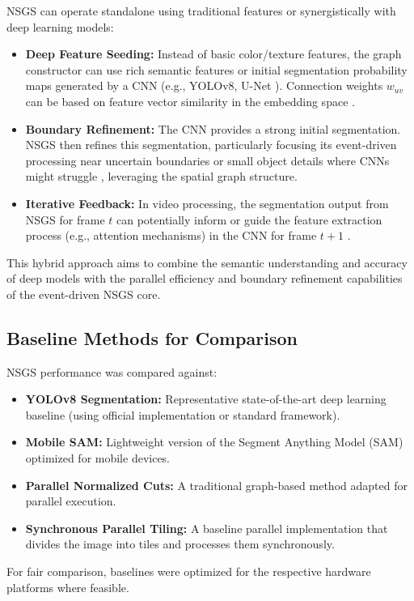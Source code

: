 \documentclass[conference]{IEEEtran}
\begin{document}
NSGS can operate standalone using traditional features or synergistically with deep learning models:
\begin{itemize}
    \item \textbf{Deep Feature Seeding:} Instead of basic color/texture features, the graph constructor can use rich semantic features or initial segmentation probability maps generated by a CNN (e.g., YOLOv8, U-Net \cite{Ronneberger2015}). Connection weights \(w_{uv}\) can be based on feature vector similarity in the embedding space \cite{Hinton2006}.
    \item \textbf{Boundary Refinement:} The CNN provides a strong initial segmentation. NSGS then refines this segmentation, particularly focusing its event-driven processing near uncertain boundaries or small object details where CNNs might struggle \cite{Wang2020, Lin2022}, leveraging the spatial graph structure.
    \item \textbf{Iterative Feedback:} In video processing, the segmentation output from NSGS for frame \(t\) can potentially inform or guide the feature extraction process (e.g., attention mechanisms) in the CNN for frame \(t+1\) \cite{Chen2021, Sun2019}.
\end{itemize}
This hybrid approach aims to combine the semantic understanding and accuracy of deep models with the parallel efficiency and boundary refinement capabilities of the event-driven NSGS core.

\subsection{Baseline Methods for Comparison}

NSGS performance was compared against:
\begin{itemize}
    \item \textbf{YOLOv8 Segmentation:} Representative state-of-the-art deep learning baseline (using official implementation or standard framework).
    \item \textbf{Mobile SAM:} Lightweight version of the Segment Anything Model (SAM) optimized for mobile devices.
    \item \textbf{Parallel Normalized Cuts:} A traditional graph-based method adapted for parallel execution. %
    \item \textbf{Synchronous Parallel Tiling:} A baseline parallel implementation that divides the image into tiles and processes them synchronously.
\end{itemize}
For fair comparison, baselines were optimized for the respective hardware platforms where feasible.
\end{document}
